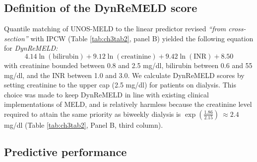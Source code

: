 \documentclass[11pt,twoside,]{book}
\begin{document}
\begin{table}[!h]
\centering
\caption{\label{tab:ch3tab2relweights}Relative weights put on bilirubin, creatinine and INR by UNOS-MELD, ReMELD and DynReMELD. Relative weights were calculated $w_{i} = \frac{\beta_{i}\text{SD}_{i}}{\sum_{j}^{}{\beta_{j}\text{SD}_{j}}}$, where $\beta_{i}$ is the coefficient on biomarker $i$ and $\text{SD}_{i}$ its standard deviation in the development cohort.}
\centering
{}
\end{table}

\subsection{Definition of the DynReMELD score}\label{definition-of-the-dynremeld-score}

Quantile matching of UNOS-MELD to the linear predictor revised \emph{``from
cross-section''} with IPCW (Table \ref{tab:ch3tab2}, panel B) yielded the following
equation for \emph{DynReMELD:}
\[
4.14 \ln(\text{bilirubin}) + 9.12 \ln(\text{creatinine}) + 9.42 \ln(\text{INR}) + 8.50
\]
with creatinine bounded between 0.8 and 2.5 mg/dl, bilirubin between 0.6 and 55 mg/dl, and
the INR between 1.0 and 3.0. We calculate DynReMELD scores by setting
creatinine to the upper cap (2.5 mg/dl) for patients on dialysis. This choice
was made to keep DynReMELD in line with existing clinical implementations of
MELD, and is relatively harmless because the creatinine level required
to attain the same priority as biweekly dialysis is
\(\exp\left( \frac{1.86}{2.15} \right)\  \approx 2.4\ \)mg/dl (Table \ref{tab:ch3tab2},
Panel B, third column).

\FloatBarrier

\subsection{Predictive performance}\label{predictive-performance}
\end{document}
